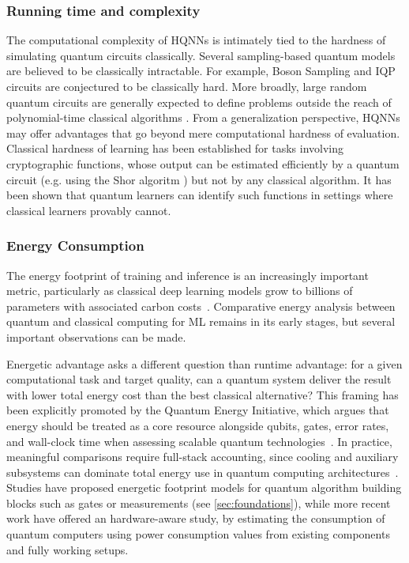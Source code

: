 \documentclass[aps,10pt,groupedaddress,prx,superscriptaddress,twocolumn,balancelastpage, tightenlines]{revtex4-2}
\theoremstyle{plain}  %
\begin{document}
        \subsubsection{Running time and complexity}

The computational complexity of HQNNs is intimately tied to the hardness of simulating quantum circuits classically. Several sampling-based quantum models are believed to be classically intractable. For example, Boson Sampling \cite{aaronson_computational_2011} and \gls{IQP} circuits \cite{bremner_classical_2010} are conjectured to be classically hard. More broadly, large random quantum circuits are generally expected to define problems outside the reach of polynomial-time classical algorithms \cite{bouland_complexity_2019}. From a generalization perspective, HQNNs may offer advantages that go beyond mere computational hardness of evaluation. 
Classical hardness of learning has been established for tasks involving cryptographic functions, whose output can be estimated efficiently by a quantum circuit (e.g. using the Shor algoritm \cite{Shor1997Polynomial}) but not by any classical algorithm. It has been shown \cite{jerbi_quantum_2023, thabet_when_2026} that quantum learners can identify such functions in settings where classical learners provably cannot.

        \subsubsection{Energy Consumption}\label{subsubsec:Energy_Consumption}


The energy footprint of training and inference is an increasingly important metric, particularly as classical deep learning models grow to billions of parameters with associated carbon costs~\cite{strubell2019energy, patterson2021carbon}. Comparative energy analysis between quantum and classical computing for ML remains in its early stages, but several important observations can be made.

Energetic advantage asks a different question than runtime advantage: for a given computational task and target quality, can a quantum system deliver the result with lower total energy cost than the best classical alternative? This framing has been explicitly promoted by the Quantum Energy Initiative, which argues that energy should be treated as a core resource alongside qubits, gates, error rates, and wall-clock time when assessing scalable quantum technologies~\cite{auffeves2022quantum}. In practice, meaningful comparisons require full-stack accounting, since cooling and auxiliary subsystems can dominate total energy use in quantum computing architectures~\cite{fellous-asiani_optimizing_2023, mccollum_energy_2026}. Studies \cite{fellous-asiani_optimizing_2023, Woitzik2024} have proposed energetic footprint models for quantum algorithm building blocks such as gates or measurements (see \autoref{sec:foundations}), while more recent work \cite{carrasco-codina_energy_2026, soret_quantum_2026} have offered an hardware-aware study, by estimating the consumption of quantum computers using power consumption values from existing components and fully working setups.
\end{document}
